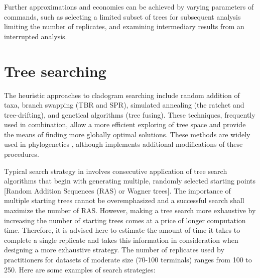 Further approximations and economies can be achieved by varying parameters of commands, such as selecting a limited 
subset of trees for subsequent analysis limiting the number of replicates, and examining intermediary results from an 
interrupted analysis.

\section{Tree searching}
The heuristic approaches to cladogram searching include random addition of taxa, branch swapping (TBR and SPR), 
simulated annealing (the ratchet and tree-drifting), and genetical algorithms (tree fusing). These techniques, frequently 
used in combination, allow a more efficient exploring of tree space and provide the means of finding more globally 
optimal solutions. These methods are widely used in phylogenetics \cite{felsenstein2004a, wheeleretal2006}, although 
\poy implements additional modifications of these procedures.

Typical search strategy in \poy involves consecutive application of tree search algorithms that begin with generating 
multiple, randomly selected starting points [Random Addition Sequences (RAS) or Wagner trees]. The importance 
of multiple starting trees cannot be overemphasized and a successful search shall maximize the number of RAS.
 However, making a tree search more exhaustive by increasing the number of starting trees comes at a price of longer 
 computation time. Therefore, it is advised here to estimate the amount of time it takes to complete a single replicate 
 and takes this information in consideration when designing a more exhaustive strategy. The  number of replicates 
 used by \poy practitioners for datasets of moderate size (70-100 terminals) ranges from 100 to 250. Here are some 
 examples of search strategies:
 
